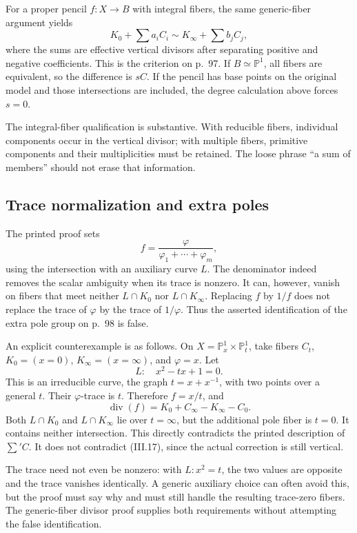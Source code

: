 For a proper pencil \(f:X\to B\) with integral fibers, the same generic-fiber argument yields \[
K_0+\sum a_i C_i\sim K_\infty+\sum b_j C_j,
\tag{III.17}
\] where the sums are effective vertical divisors after separating positive and negative coefficients. This is the criterion on p.~97. If \(B\simeq\mathbb{P}^1\), all fibers are equivalent, so the difference is \(sC\). If the pencil has base points on the original model and those intersections are included, the degree calculation above forces \(s=0\).

The integral-fiber qualification is substantive. With reducible fibers, individual components occur in the vertical divisor; with multiple fibers, primitive components and their multiplicities must be retained. The loose phrase ``a sum of members'' should not erase that information.

\subsection{Trace normalization and extra poles}

The printed proof sets \[
f=\frac{\varphi}{\varphi_1+\cdots+\varphi_m},
\] using the intersection with an auxiliary curve \(L\). The denominator indeed removes the scalar ambiguity when its trace is nonzero. It can, however, vanish on fibers that meet neither \(L\cap K_0\) nor \(L\cap K_\infty\). Replacing \(f\) by \(1/f\) does not replace the trace of \(\varphi\) by the trace of \(1/\varphi\). Thus the asserted identification of the extra pole group on p.~98 is false.

An explicit counterexample is as follows. On \(X=\mathbb{P}^1_x\times\mathbb{P}^1_t\), take fibers \(C_t\), \(K_0=(x=0)\), \(K_\infty=(x=\infty)\), and \(\varphi=x\). Let \[
L:\quad x^2-tx+1=0.
\] This is an irreducible curve, the graph \(t=x+x^{-1}\), with two points over a general \(t\). Their \(\varphi\)-trace is \(t\). Therefore \(f=x/t\), and \[
\operatorname{div}(f)=K_0+C_\infty-K_\infty-C_0.
\tag{III.18}
\] Both \(L\cap K_0\) and \(L\cap K_\infty\) lie over \(t=\infty\), but the additional pole fiber is \(t=0\). It contains neither intersection. This directly contradicts the printed description of \(\sum' C\). It does not contradict (III.17), since the actual correction is still vertical.

The trace need not even be nonzero: with \(L:x^2=t\), the two values are opposite and the trace vanishes identically. A generic auxiliary choice can often avoid this, but the proof must say why and must still handle the resulting trace-zero fibers. The generic-fiber divisor proof supplies both requirements without attempting the false identification.

